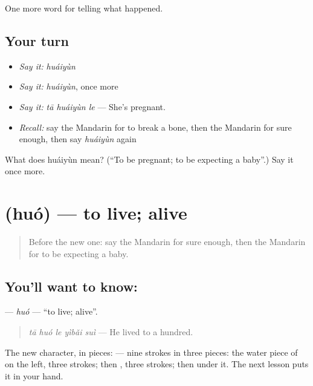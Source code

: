 \begin{grammarlens}[title={What you've built}]
One more word for telling what happened.
\end{grammarlens}

\subsection*{Your turn}
\begin{itemize}
\raggedright
  \item \emph{Say it:} \emph{huáiyùn}
  \item \emph{Say it:} \emph{huáiyùn}, once more
  \item \emph{Say it:} \emph{tā huáiyùn le} — She's pregnant.
  \item \emph{Recall:} say the Mandarin for to break a bone, then the Mandarin for sure enough, then say \emph{huáiyùn} again
\end{itemize}

\begin{tcolorbox}[breakable,colback=teal!4,colframe=teal!35!black,title={Before you move on}]
What does huáiyùn mean? (\textquotedblleft{}To be pregnant; to be expecting a baby\textquotedblright{}.) Say it once more.
\end{tcolorbox}
\section[\texorpdfstring{\zh{活} (huó)}{活 (huó)}]{ (huó) — to live; alive}

\label{lesson:ZH-C302-huo}



\begin{quote}
Before the new one: say the Mandarin for sure enough, then the Mandarin for to be expecting a baby.
\end{quote}

\subsection*{You'll want to know: }
\textbf{} — \emph{huó} — \textquotedblleft{}to live; alive\textquotedblright{}.

\begin{quote}
\textbf{} \emph{tā huó le yìbǎi suì} — He lived to a hundred.
\end{quote}

The new character, in pieces:  — nine strokes in three pieces: the water piece of  on the left, three strokes; then , three strokes; then  under it. The next lesson puts it in your hand.

